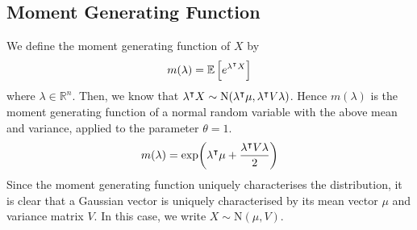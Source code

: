 \documentclass{article}
\begin{document}
\subsection{Moment Generating Function}
We define the moment generating function of $X$ by
\[ m(\lambda) = \mathbb{E}\left[{e^{\lambda^\intercal X}}\right] \]
where $\lambda \in \mathbb R^n$. Then, we know that $\lambda^\intercal X \sim \mathrm{N}(\lambda^\intercal \mu, \lambda^\intercal V \lambda)$. Hence $m(\lambda)$ is the moment generating function of a normal random variable with the above mean and variance, applied to the parameter $\theta = 1$.
\[ m(\lambda) = \exp(\lambda^\intercal \mu + \frac{\lambda^\intercal V\lambda}{2}) \]
Since the moment generating function uniquely characterises the distribution, it is clear that a Gaussian vector is uniquely characterised by its mean vector $\mu$ and variance matrix $V$. In this case, we write $X \sim \mathrm{N}(\mu, V)$.
\end{document}
